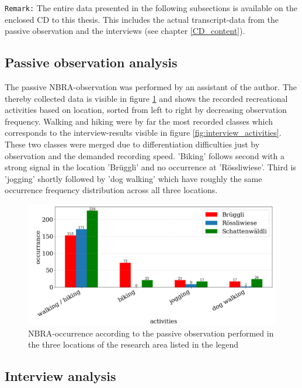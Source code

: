 \texttt{Remark:} The entire data presented in the following subsections is available on the enclosed CD to this thesis. This includes the actual transcript-data from the passive observation and the interviews (see chapter \ref{CD_content}).

\subsection{Passive observation analysis}
The passive NBRA-observation was performed by an assistant of the author. The thereby collected data is visible in figure \ref{fig:passive_observation} and shows the recorded recreational activities based on location, sorted from left to right by decreasing observation frequency. Walking and hiking were by far the most recorded classes which corresponds to the interview-results visible in figure \ref{fig:interview_activities}. These two classes were merged due to differentiation difficulties just by observation and the demanded recording speed. 'Biking' follows second with a strong signal in the location 'Br\"uggli' and no occurrence at 'R\"ossliwiese'. Third is 'jogging' shortly followed by 'dog walking' which have roughly the same occurrence frequency distribution across all three locations.

\begin{figure}[!htb]
   \centering
   \includegraphics[width=\textwidth]{img/passive_observations.pdf}
   \caption{NBRA-occurrence according to the passive observation performed in the three locations of the research area listed in the legend}
   \label{fig:passive_observation}
\end{figure}

\subsection{Interview analysis}

